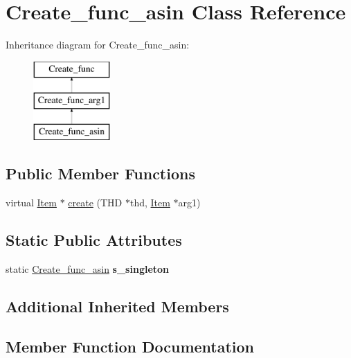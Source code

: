 \hypertarget{classCreate__func__asin}{}\section{Create\+\_\+func\+\_\+asin Class Reference}
\label{classCreate__func__asin}
Inheritance diagram for Create\+\_\+func\+\_\+asin\+:\begin{figure}[H]
\begin{center}
\leavevmode
\includegraphics[height=3.000000cm]{classCreate__func__asin}
\end{center}
\end{figure}
\subsection*{Public Member Functions}
\begin{DoxyCompactItemize}
\item 
virtual \mbox{\hyperlink{classItem}{Item}} $\ast$ \mbox{\hyperlink{classCreate__func__asin_a972335219cd7939f1dd8721a188c99fb}{create}} (T\+HD $\ast$thd, \mbox{\hyperlink{classItem}{Item}} $\ast$arg1)
\end{DoxyCompactItemize}
\subsection*{Static Public Attributes}
\begin{DoxyCompactItemize}
\item 
\mbox{\label{classCreate__func__asin_a62b23384c29510c60d22c473e81575e5}} 
static \mbox{\hyperlink{classCreate__func__asin}{Create\+\_\+func\+\_\+asin}} {\bfseries s\+\_\+singleton}
\end{DoxyCompactItemize}
\subsection*{Additional Inherited Members}


\subsection{Member Function Documentation}
\mbox{\label{classCreate__func__asin_a972335219cd7939f1dd8721a188c99fb}} 
